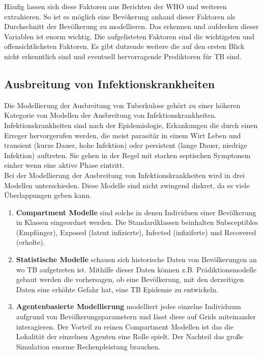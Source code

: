 \documentclass[paper=a4, fontsize=11pt, ngerman, abstract=on]{scrartcl}
\numberwithin{equation}{section} %
\numberwithin{figure}{section} %
\numberwithin{table}{section} %
\begin{document}
Häufig lassen sich diese Faktoren aus Berichten der WHO und weiteren extrahieren. So ist es möglich eine Bevökerung anhand dieser Faktoren als Durchschnitt der Bevölkerung zu modellieren. Das erkennen und aufdecken dieser Variablen ist enorm wichtig. Die aufgelisteten Faktoren sind die wichtigsten und offensichtlichsten Faktoren. Es gibt dutzende weitere die auf den ersten Blick nicht erkenntlich sind und eventuell hervorragende Prediktoren für TB sind.

\subsection{Ausbreitung von Infektionskrankheiten}

Die Modellierung der Ausbreitung von Tuberkulose gehört zu einer höheren Kategorie von Modellen der Ausbreitung von Infektionskrankheiten. Infektionskrankheiten sind nach der Epidemiologie, Erkankungen die durch einen Erreger hervorgerufen werden, die meist parasitär in einem Wirt Leben und transient (kurze Dauer, hohe Infektion) oder persistent (lange Dauer, niedrige Infektion) auftreten. Sie gehen in der Regel mit starken septischen Symptonem einher wenn eine aktive Phase eintritt. \\

Bei der Modellierung der Ausbreitung von Infektionskrankheiten wird in drei Modellen unterschieden. Diese Modelle sind nicht zwingend diskret, da es viele Überlappungen geben kann.

\begin{enumerate}
  \item{\textbf{Compartment Modelle} sind solche in denen Individuen einer Bevölkerung in Klassen eingeordnet werden. Die Standardklassen beinhalten Subsceptibles (Empfänger), Exposed (latent infizierte), Infected (infiziferte) und Recovered (erholte).}
  \item{\textbf{Statistische Modelle} schauen sich historische Daten von Bevölkerungen an wo TB aufgetreten ist. Mithilfe dieser Daten können z.B. Prädiktionsmodelle gebaut werden die vorhersagen, ob eine Bevölkerung, mit den derzeitigen Daten eine erhöhte Gefahr hat, eine TB Epidemie zu entwickeln.}
  \item{\textbf{Agentenbasierte Modellierung} modelliert jedes einzelne Individuum aufgrund von Bevölkerungsparametern und lässt diese auf Grids miteinander interagieren. Der Vorteil zu reinen Compartment Modellen ist das die Lokalität der einzelnen Agenten eine Rolle spielt. Der Nachteil das große Simulation enorme Rechenpleistung brauchen.}
\end{enumerate}
\end{document}
